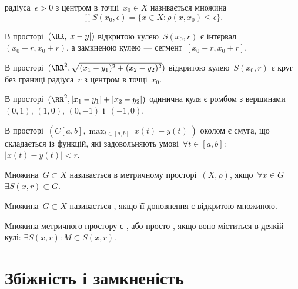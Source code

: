 \begin{definition}
 радіуса~$\epsilon > 0$ з центром в
точці~$x_0 \in X$ називається множина
\begin{equation*}
    \closure S(x_0, \epsilon) = \{x \in X: \rho(x, x_0) \le \epsilon \}.
\end{equation*}
\end{definition}

\begin{example}
В просторі~$(\RR, |x - y|)$ відкритою кулею~$S(x_0, r)$
є інтервал~$(x_0 - r, x_0 + r)$, а замкненою кулею ---
сегмент~$[x_0 - r, x_0 + r]$.
\end{example}

\begin{example}
В просторі~$(\RR^2, \sqrt{(x_1 - y_1)^2 + (x_2 - y_2)^2})$ відкритою
кулею~$S(x_0, r)$ є круг без границі радіуса~$r$ з центром в точці~$x_0$.
\end{example}

\begin{example}
В просторі~$(\RR^2, |x_1 - y_1| + |x_2 - y_2|)$ одинична
куля є ромбом з вершинами~$(0, 1)$, $(1, 0)$, $(0, -1)$ і~$(-1, 0)$.
\end{example}

\begin{example}
В просторі~$\left( C[a, b], \max_{t \in [a, b]} |x(t) - y(t)| \right)$
околом є смуга, що складається із функцій, які
задовольняють умові~$\forall t \in [a, b]$: $|x(t) - y (t)| < r$.
\end{example}

\begin{definition}
Множина~$G \subset  X$ називається  в
метричному просторі~$(X, \rho)$, якщо~$\forall x \in G$~$\exists S(x, r) \subset G$.
\end{definition}

\begin{definition}
Множина~$G \subset X$ називається , якщо
її доповнення є відкритою множиною.
\end{definition}

\begin{definition}
Множина метричного простору є , або просто , якщо воно
міститься в деякій кулі: $\exists S(x, r): M \subset S(x, r)$.
\end{definition}

\section{Збіжність і замкненість}

